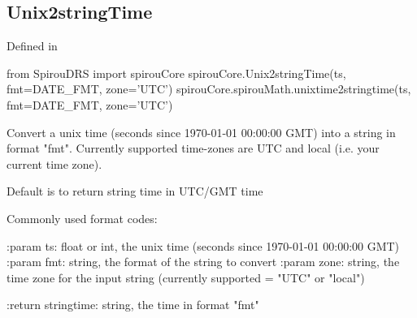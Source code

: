 \noindent\begin{minipage}{\textwidth}
\subsection{Unix2stringTime}

Defined in \spirouCore{}

\begin{pythonbox}
from SpirouDRS import spirouCore
spirouCore.Unix2stringTime(ts, fmt=DATE_FMT, zone='UTC')
spirouCore.spirouMath.unixtime2stringtime(ts, fmt=DATE_FMT, zone='UTC')
\end{pythonbox}

\begin{pythondocstring}
Convert a unix time (seconds since  1970-01-01 00:00:00 GMT) into a
string in format "fmt". Currently supported time-zones are UTC and local
(i.e. your current time zone).

Default is to return string time in UTC/GMT time

Commonly used format codes:


:param ts: float or int, the unix time (seconds since 1970-01-01 00:00:00
           GMT)
:param fmt: string, the format of the string to convert
:param zone: string, the time zone for the input string
                      (currently supported =  "UTC" or "local")

:return stringtime: string, the time in format "fmt"
\end{pythondocstring}
\end{minipage}

